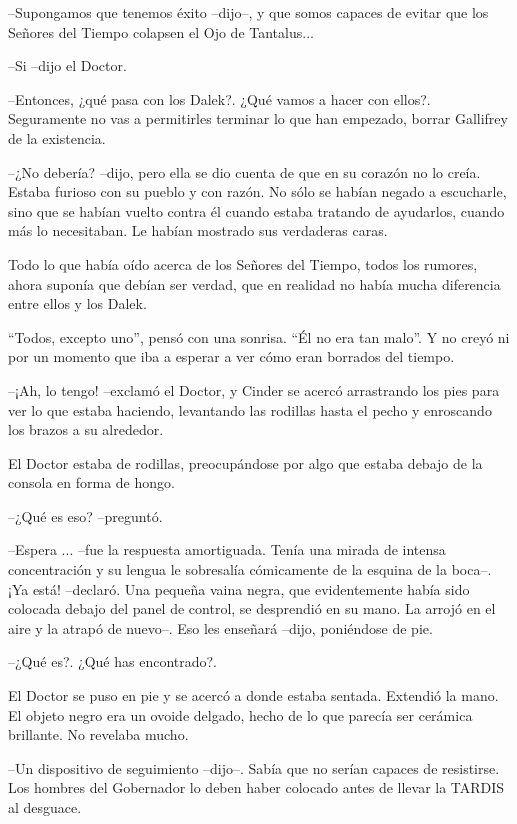 --Supongamos que tenemos éxito --dijo--, y que somos capaces de evitar que los Señores del Tiempo colapsen el Ojo de Tantalus...

--Si --dijo el Doctor.

--Entonces, ¿qué pasa con los Dalek?. ¿Qué vamos a hacer con ellos?. Seguramente no vas a permitirles terminar lo que han empezado, borrar Gallifrey de la existencia.

--¿No debería? --dijo, pero ella se dio cuenta de que en su corazón no lo creía. Estaba furioso con su pueblo y con razón. No sólo se habían negado a escucharle, sino que se habían vuelto contra él cuando estaba tratando de ayudarlos, cuando más lo necesitaban. Le habían mostrado sus verdaderas caras.

Todo lo que había oído acerca de los Señores del Tiempo, todos los rumores, ahora suponía que debían ser verdad, que en realidad no había mucha diferencia entre ellos y los Dalek.

``Todos, excepto uno'', pensó con una sonrisa. ``Él no era tan malo''. Y no creyó ni por un momento que iba a esperar a ver cómo eran borrados del tiempo.



--¡Ah, lo tengo! --exclamó el Doctor, y Cinder se acercó arrastrando los pies para ver lo que estaba haciendo, levantando las rodillas hasta el pecho y enroscando los brazos a su alrededor.

El Doctor estaba de rodillas, preocupándose por algo que estaba debajo de la consola en forma de hongo. 



--¿Qué es eso? --preguntó.

--Espera ... --fue la respuesta amortiguada. Tenía una mirada de intensa concentración y su lengua le sobresalía cómicamente de la esquina de la boca--. ¡Ya está! --declaró. Una pequeña vaina negra, que evidentemente había sido colocada debajo del panel de control, se desprendió en su mano. La arrojó en el aire y la atrapó de nuevo--. Eso les enseñará --dijo, poniéndose de pie.

--¿Qué es?. ¿Qué has encontrado?.



El Doctor se puso en pie y se acercó a donde estaba sentada. Extendió la mano. El objeto negro era un ovoide delgado, hecho de lo que parecía ser cerámica brillante. No revelaba mucho. 



--Un dispositivo de seguimiento --dijo--. Sabía que no serían capaces de resistirse. Los hombres del Gobernador lo deben haber colocado antes de llevar la TARDIS al desguace.

